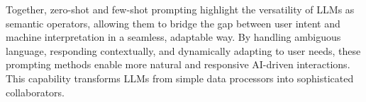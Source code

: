 Together, zero-shot and few-shot prompting highlight the versatility of LLMs as semantic operators, allowing them to bridge the gap between user intent and machine interpretation in a seamless, adaptable way.
By handling ambiguous language, responding contextually, and dynamically adapting to user needs, these prompting methods enable more natural and responsive AI-driven interactions.
This capability transforms LLMs from simple data processors into sophisticated collaborators.







